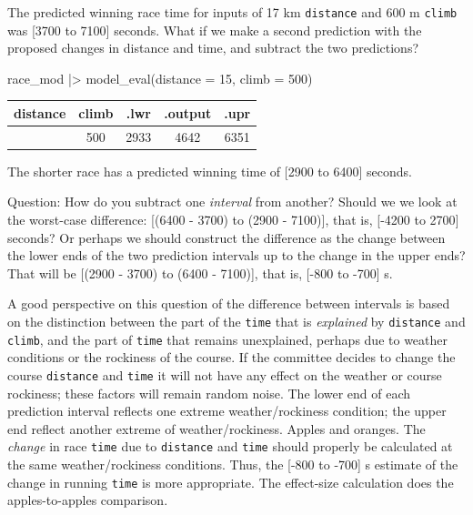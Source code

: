 \documentclass[
  letterpaper,
  DIV=11,
  numbers=noendperiod,
  oneside]{scrartcl}
\newenvironment{Shaded}{\begin{snugshade}}{\end{snugshade}}
\newcommand{\AttributeTok}[1]{\textcolor[rgb]{0.40,0.45,0.13}{#1}}
\newcommand{\DecValTok}[1]{\textcolor[rgb]{0.68,0.00,0.00}{#1}}
\newcommand{\FunctionTok}[1]{\textcolor[rgb]{0.28,0.35,0.67}{#1}}
\newcommand{\NormalTok}[1]{\textcolor[rgb]{0.00,0.23,0.31}{#1}}
\newcommand{\SpecialCharTok}[1]{\textcolor[rgb]{0.37,0.37,0.37}{#1}}
\begin{document}
\begin{tcolorbox}[enhanced jigsaw, colbacktitle=quarto-callout-note-color!10!white, opacityback=0, breakable, opacitybacktitle=0.6, colback=white, coltitle=black, arc=.35mm, title=\textcolor{quarto-callout-note-color}{\faInfo}\hspace{0.5em}{Comparing predictions?}, left=2mm, colframe=quarto-callout-note-color-frame, rightrule=.15mm, bottomrule=.15mm, leftrule=.75mm, bottomtitle=1mm, toptitle=1mm, titlerule=0mm, toprule=.15mm]

The predicted winning race time for inputs of 17 km \texttt{distance}
and 600 m \texttt{climb} was {[}3700 to 7100{]} seconds. What if we make
a second prediction with the proposed changes in distance and time, and
subtract the two predictions?

\begin{Shaded}
\begin{Highlighting}[]
\NormalTok{race\_mod }\SpecialCharTok{|\textgreater{}} \FunctionTok{model\_eval}\NormalTok{(}\AttributeTok{distance =} \DecValTok{15}\NormalTok{, }\AttributeTok{climb =} \DecValTok{500}\NormalTok{)}
\end{Highlighting}
\end{Shaded}

\begin{longtable}[]{@{}ccccc@{}}
\toprule\noalign{}
distance & climb & .lwr & .output & .upr \\
\midrule\noalign{}
\endhead
\bottomrule\noalign{}
\endlastfoot
15 & 500 & 2933 & 4642 & 6351 \\
\end{longtable}

The shorter race has a predicted winning time of {[}2900 to 6400{]}
seconds.

Question: How do you subtract one \emph{interval} from another? Should
we we look at the worst-case difference: {[}(6400 - 3700) to (2900 -
7100){]}, that is, {[}-4200 to 2700{]} seconds? Or perhaps we should
construct the difference as the change between the lower ends of the two
prediction intervals up to the change in the upper ends? That will be
{[}(2900 - 3700) to (6400 - 7100){]}, that is, {[}-800 to -700{]} s.

A good perspective on this question of the difference between intervals
is based on the distinction between the part of the \texttt{time} that
is \emph{explained} by \texttt{distance} and \texttt{climb}, and the
part of \texttt{time} that remains unexplained, perhaps due to weather
conditions or the rockiness of the course. If the committee decides to
change the course \texttt{distance} and \texttt{time} it will not have
any effect on the weather or course rockiness; these factors will remain
random noise. The lower end of each prediction interval reflects one
extreme weather/rockiness condition; the upper end reflect another
extreme of weather/rockiness. Apples and oranges. The \emph{change} in
race \texttt{time} due to \texttt{distance} and \texttt{time} should
properly be calculated at the same weather/rockiness conditions. Thus,
the {[}-800 to -700{]} s estimate of the change in running \texttt{time}
is more appropriate. The effect-size calculation does the
apples-to-apples comparison.


\end{tcolorbox}
\end{document}
